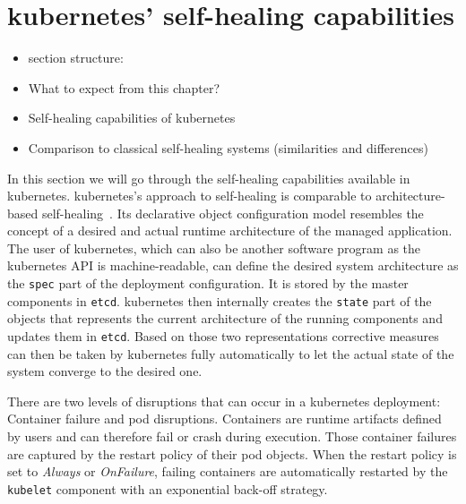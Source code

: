 
\section{\Gls{kubernetes}' self-healing capabilities}\label{sec:self-healing-kubernetes}
  \begin{itemize}
    \item section structure:
    \item What to expect from this chapter?
    \item Self-healing capabilities of \gls{kubernetes}
    \item Comparison to classical self-healing systems (similarities and differences)
  \end{itemize}

  In this section we will go through the self-healing capabilities available in \gls{kubernetes}.
  \gls{kubernetes}'s approach to self-healing is comparable to architecture-based self-healing~\cite{ToffettiMicroservices,DashofyArchitecture}.
  Its declarative object configuration model resembles the concept of a desired and actual runtime architecture of the managed application.
  The user of \gls{kubernetes}, which can also be another software program as the \gls{kubernetes} API is machine-readable, can define the desired system architecture as the \texttt{spec} part of the deployment configuration.
  It is stored by the master components in \texttt{etcd}.
  \Gls{kubernetes} then internally creates the \texttt{state} part of the objects that represents the current architecture of the running components and updates them in \texttt{etcd}.
  Based on those two representations corrective measures can then be taken by \gls{kubernetes} fully automatically to let the actual state of the system converge to the desired one.

  There are two levels of disruptions that can occur in a \gls{kubernetes} deployment: Container failure and pod disruptions.
  Containers are runtime artifacts defined by users and can therefore fail or crash during execution.
  Those container failures are captured by the restart policy of their pod objects.
  When the restart policy is set to \textit{Always} or \textit{OnFailure}, failing containers are automatically restarted by the \texttt{kubelet} component with an exponential back-off strategy.

